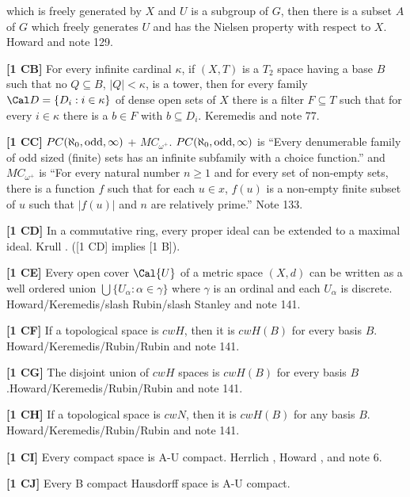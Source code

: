 which is freely generated by $X$ and $U$ is a subgroup of $G$, then there
is a subset $A$ of $G$ which freely generates $U$ and has the Nielsen
property with respect to $X$.  \ac{Howard} \cite{1985} and note 129.
\smallskip
\item{}{\bf [1 CB]} For every infinite cardinal $\kappa$, if $(X,T)$ is
a $T_2$ space having a base $B$ such that no $Q\subseteq B$, $|Q| <
\kappa$, is a tower, then for every family $\Cal D=\{D_i:i\in\kappa\}$
of dense open sets of $X$ there is a filter $F\subseteq T$ such that
for every $i\in\kappa$ there  is a $b\in F$ with $b\subseteq D_i$.
\ac{Keremedis} \cite{1998a} and note 77.
\smallskip
\item{}{\bf [1 CC]}  $PC(\aleph_0,\hbox{odd},\infty)$ +
$MC_{\omega^+}$. $PC(\aleph_0,\hbox{odd},\infty)$ is
``Every denumerable family of odd sized (finite) sets has an
infinite subfamily with a choice function.'' and $MC_{\omega^+}$
is ``For every natural number $n \ge 1$ and for
every set of non-empty sets, there is a function $f$ such that for
each $u\in x$, $f(u)$ is a non-empty finite subset of $u$  such
that $|f(u)|$ and $n$ are relatively prime.'' Note  133.
\smallskip
\item{}{\bf [1 CD]} In a commutative ring, every proper ideal can be
extended to a maximal ideal. \ac{Krull} \cite{1929}. ([1 CD] implies [1 B]).
\smallskip
\item{}{\bf [1 CE]} Every open cover $\Cal{U}$ of a metric space $(X,d)$
can be written as a well ordered union $\bigcup\{U_\alpha :
\alpha\in\gamma\}$ where $\gamma$ is an ordinal and each $U_\alpha$ is
discrete. \ac{Howard/Keremedis/slash Rubin/slash Stanley} \cite{1999} and
note 141.
\smallskip
\item{}{\bf [1 CF]} If a topological space is $cwH$, then it is $cwH(B)$
for every basis $B$. \ac{Howard/Keremedis/Rubin/Rubin} \cite{1998b}
and note 141.
\smallskip
\item{}{\bf [1 CG]} The disjoint union of $cwH$ spaces is $cwH(B)$
for every basis $B$.\newline \ac{Howard/Keremedis/Rubin/Rubin}
\cite{1998b} and note 141.
\smallskip
\item{}{\bf [1 CH]} If a topological space is $cwN$, then it is $cwH(B)$
for any basis $B$. \ac{Howard/Keremedis/Rubin/Rubin} \cite{1998b}
and note 141.
\smallskip
\item{}{\bf [1 CI]} Every compact space is A-U compact.  \ac{Herrlich}
\cite{1996a}, \ac{Howard} \cite{1990}, and note 6.
\smallskip
\item{}{\bf [1 CJ]} Every B compact Hausdorff space is A-U compact.
